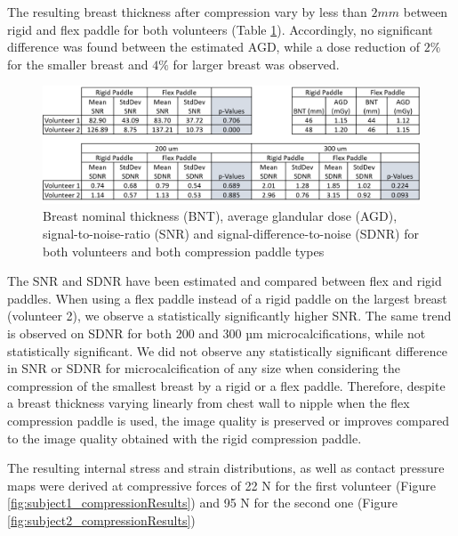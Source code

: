 The resulting breast thickness after compression vary by less than $2mm$ between rigid and flex paddle for both volunteers (Table \ref{fig:table_compression_results}). Accordingly, no significant difference was found between the estimated AGD, while a dose reduction of $2\%$ for the smaller breast and $4\%$ for larger breast was observed.

\begin{figure}[!h]
\centering
\includegraphics[width=\textwidth,keepaspectratio]{figures/table_compression_results.png} 
\caption{Breast nominal thickness (BNT), average glandular dose (AGD), signal-to-noise-ratio (SNR) and signal-difference-to-noise (SDNR) for both volunteers and both compression paddle types}\label{fig:table_compression_results}
\end{figure}

The SNR and SDNR have been estimated and compared between flex and rigid paddles. When using a flex paddle instead of a rigid paddle on the largest breast (volunteer 2), we observe a statistically significantly higher SNR. The same trend is observed on SDNR for both 200 and 300 µm microcalcifications, while not statistically significant. We did not observe any statistically significant difference in SNR or SDNR for microcalcification of any size when considering the compression of the smallest breast by a rigid or a flex paddle. Therefore, despite a breast thickness varying linearly from chest wall to nipple when the flex compression paddle is used, the image quality is preserved or improves compared to the image quality obtained with the rigid compression paddle.




The resulting internal stress and strain distributions, as well as contact pressure maps were derived at compressive forces of 22 N for the first volunteer (Figure \ref{fig:subject1_compressionResults}) and 95 N for the second one (Figure \ref{fig:subject2_compressionResults})


